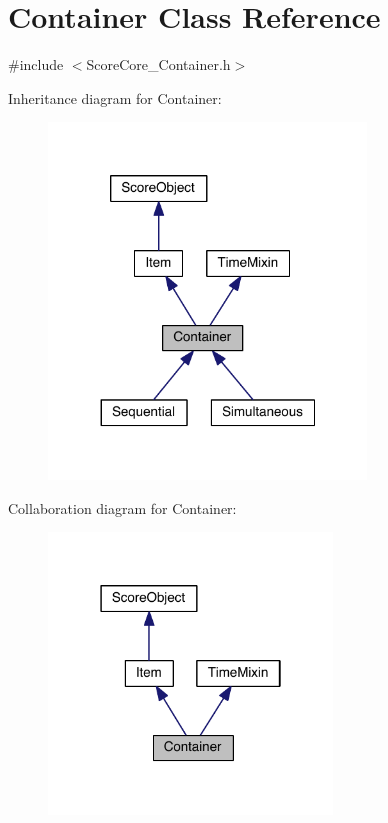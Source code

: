 \hypertarget{class_container}{\section{Container Class Reference}
\label{class_container}
}


{\ttfamily \#include $<$Score\-Core\-\_\-\-Container.\-h$>$}



Inheritance diagram for Container\-:\nopagebreak
\begin{figure}[H]
\begin{center}
\leavevmode
\includegraphics[width=239pt]{class_container__inherit__graph}
\end{center}
\end{figure}


Collaboration diagram for Container\-:\nopagebreak
\begin{figure}[H]
\begin{center}
\leavevmode
\includegraphics[width=214pt]{class_container__coll__graph}
\end{center}
\end{figure}
